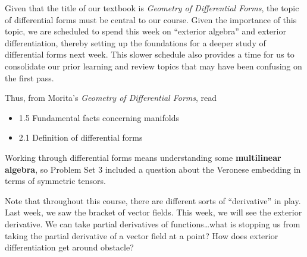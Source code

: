 \documentclass{homework}
\author{Jim Fowler}
\date{Week 4: Exterior algebra}
\begin{document}
\maketitle

Given that the title of our textbook is \textit{Geometry of
Differential Forms}, the topic of differential forms must be central
to our course.  Given the importance of this topic, we are scheduled
to spend this week on ``exterior algebra'' and exterior
differentiation, thereby setting up the foundations for a deeper study
of differential forms next week.  This slower schedule also provides a
time for us to consolidate our prior learning and review topics that
may have been confusing on the first pass.

Thus, from Morita's \textit{Geometry of Differential Forms}, read
\begin{itemize}
\item 1.5 Fundamental facts concerning manifolds
\item 2.1 Definition of differential forms
\end{itemize}
Working through differential forms means understanding some
\textbf{multilinear algebra}, so Problem Set 3 included a question
about the Veronese embedding in terms of symmetric tensors.

Note that throughout this course, there are different sorts of
``derivative'' in play.  Last week, we saw the bracket of vector
fields.  This week, we will see the exterior derivative.  We can take
partial derivatives of functions\ldots what is stopping us from taking
the partial derivative of a vector field at a point?  How does
exterior differentiation get around obstacle?
\end{document}
